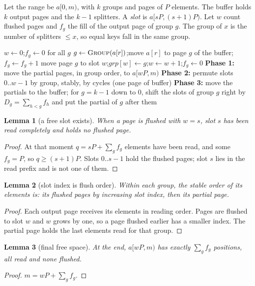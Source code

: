\documentclass[11pt]{article}
\newtheorem{lemma}{Lemma}
\theoremstyle{remark}
\begin{document}
Let the range be $a[0,m)$, with $k$ groups and pages of $P$ elements.
The buffer holds $k$ output pages and the $k-1$ splitters. A \emph{slot} is
$a[sP,(s+1)P)$. Let $w$ count flushed pages and $f_g$ the fill of the output
page of group $g$. The group of $x$ is the number of splitters $\le x$, so equal
keys fall in the same group.

\begin{algorithm}[h]
\caption{Stable paged distribution of $a[0,m)$ into $k$ groups}
\begin{algorithmic}[1]
\State $w\gets0$;\quad $f_g\gets0$ for all $g$
  \State $g\gets\textsc{Group}(a[r])$;\quad move $a[r]$ to page $g$ of the buffer;\quad $f_g\gets f_g+1$
     \State move page $g$ to slot $w$;\quad $\mathit{grp}[w]\gets g$;\quad $w\gets w+1$;\quad $f_g\gets0$
  \EndIf
\EndFor
\State \textbf{Phase 1:} move the partial pages, in group order, to $a[wP,m)$
\State \textbf{Phase 2:} permute slots $0..w-1$ by group, stably, by cycles (one page of buffer)
\State \textbf{Phase 3:} move the partials to the buffer; for $g=k-1$ down to $0$, shift the
       slots of group $g$ right by $D_g=\sum_{h<g}f_h$ and put the partial of $g$ after them
\end{algorithmic}
\end{algorithm}

\begin{lemma}[a free slot exists]\label{l:free}
When a page is flushed with $w=s$, slot $s$ has been read completely and holds no flushed page.
\end{lemma}
\begin{proof}
At that moment $q=sP+\sum_g f_g$ elements have been read, and some $f_g=P$, so
$q\ge(s+1)P$. Slots $0..s-1$ hold the flushed pages; slot $s$ lies in the read
prefix and is not one of them.
\end{proof}

\begin{lemma}[slot index is flush order]\label{l:order}
Within each group, the stable order of its elements is: its flushed pages by
increasing slot index, then its partial page.
\end{lemma}
\begin{proof}
Each output page receives its elements in reading order. Pages are flushed to
slot $w$ and $w$ grows by one, so a page flushed earlier has a smaller index.
The partial page holds the last elements read for that group.
\end{proof}

\begin{lemma}[final free space]\label{l:space}
At the end, $a[wP,m)$ has exactly $\sum_g f_g$ positions, all read and none flushed.
\end{lemma}
\begin{proof}
$m=wP+\sum_g f_g$.
\end{proof}
\end{document}
